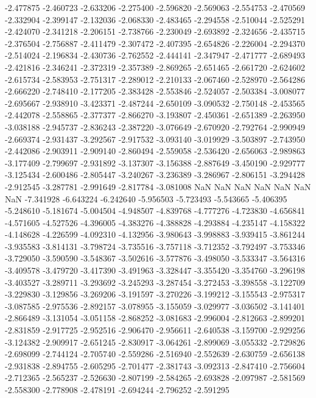 -2.477875
-2.460723
-2.633206
-2.275400
-2.596820
-2.569063
-2.554753
-2.470569
-2.332904
-2.399147
-2.132036
-2.068330
-2.483465
-2.294558
-2.510044
-2.525291
-2.424070
-2.341218
-2.206151
-2.738766
-2.230049
-2.693892
-2.324656
-2.435715
-2.376504
-2.756887
-2.411479
-2.307472
-2.407395
-2.654826
-2.226004
-2.294370
-2.514024
-2.196834
-2.430736
-2.762552
-2.444141
-2.347947
-2.471777
-2.689493
-2.421816
-2.346241
-2.372319
-2.357389
-2.869265
-2.651465
-2.661720
-2.624602
-2.615734
-2.583953
-2.751317
-2.289012
-2.210133
-2.067460
-2.528970
-2.564286
-2.666220
-2.748410
-2.177205
-2.383428
-2.553846
-2.524057
-2.503384
-3.008077
-2.695667
-2.938910
-3.423371
-2.487244
-2.650109
-3.090532
-2.750148
-2.453565
-2.442078
-2.558865
-2.377377
-2.866270
-3.193807
-2.450361
-2.651389
-2.263950
-3.038188
-2.945737
-2.836243
-2.387220
-3.076649
-2.670920
-2.792764
-2.990949
-2.669374
-2.931437
-3.292567
-2.917532
-3.093140
-3.019929
-3.503897
-2.743950
-2.442086
-2.903911
-2.909140
-2.860494
-2.559058
-2.536420
-2.656063
-2.989863
-3.177409
-2.799697
-2.931892
-3.137307
-3.156388
-2.887649
-3.450190
-2.929777
-3.125434
-2.600486
-2.805447
-3.240267
-3.236389
-3.286967
-2.806151
-3.294428
-2.912545
-3.287781
-2.991649
-2.817784
-3.081008
NaN
NaN
NaN
NaN
NaN
NaN
NaN
-7.341928
-6.643224
-6.242640
-5.956503
-5.723493
-5.543665
-5.406395
-5.248610
-5.181674
-5.004504
-4.948507
-4.839768
-4.777276
-4.723830
-4.656841
-4.571605
-4.527526
-4.396005
-4.383276
-4.388828
-4.293884
-4.235147
-4.158322
-4.148628
-4.226599
-4.092310
-4.132956
-3.980643
-3.998883
-3.939415
-3.861244
-3.935583
-3.814131
-3.798724
-3.735516
-3.757118
-3.712352
-3.792497
-3.753346
-3.729050
-3.590590
-3.548367
-3.502616
-3.577876
-3.498050
-3.533347
-3.564316
-3.409578
-3.479720
-3.417390
-3.491963
-3.328447
-3.355420
-3.354760
-3.296198
-3.403527
-3.289711
-3.293692
-3.245293
-3.287454
-3.272453
-3.398558
-3.122709
-3.229830
-3.129856
-3.269206
-3.191597
-3.270226
-3.199212
-3.155543
-2.975317
-3.087585
-2.975536
-2.892157
-3.078955
-3.155059
-3.029977
-3.036502
-3.141401
-2.866489
-3.131054
-3.051158
-2.868252
-3.081683
-2.996004
-2.812663
-2.899201
-2.831859
-2.917725
-2.952516
-2.906470
-2.956611
-2.640538
-3.159700
-2.929256
-3.124382
-2.909917
-2.651245
-2.830917
-3.064261
-2.899069
-3.055332
-2.729826
-2.698099
-2.744124
-2.705740
-2.559286
-2.516940
-2.552639
-2.630759
-2.656138
-2.931838
-2.894755
-2.605295
-2.701477
-2.381743
-3.092313
-2.847410
-2.756604
-2.712365
-2.565237
-2.526630
-2.807199
-2.584265
-2.693828
-2.097987
-2.581569
-2.558300
-2.778908
-2.478191
-2.694244
-2.796252
-2.591295
